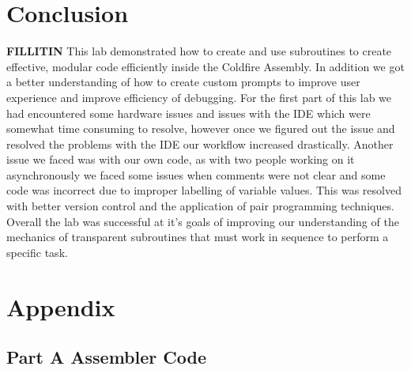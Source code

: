\documentclass[letterpaper]{article}
\begin{document}
\section{Conclusion}
  \textbf{FILLITIN}
  This lab demonstrated how to create and use subroutines to create effective, modular code efficiently inside the Coldfire Assembly.  In addition we got a better understanding of how to create custom prompts to improve user experience and improve efficiency of debugging.  For the first part of this lab we had encountered some hardware issues and issues with the IDE which were somewhat time consuming to resolve, however once we figured out the issue and resolved the problems with the IDE our workflow increased drastically.  Another issue we faced was with our own code, as with two people working on it asynchronously we faced some issues when comments were not clear and some code was incorrect due to improper labelling of variable values.  This was resolved with better version control and the application of pair programming techniques.  Overall the lab was successful at it's goals of improving our understanding of the mechanics of transparent subroutines that must work in sequence to perform a specific task.

\newpage
\section{Appendix}
  \subsection{Part A Assembler Code}
    
\newpage
\end{document}

